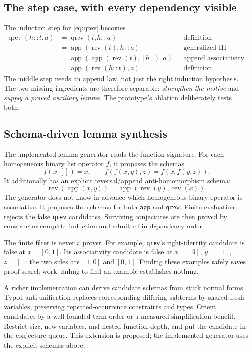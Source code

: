 \documentclass[11pt,letterpaper]{article}
\newcommand{\code}[1]{\texttt{#1}}
\theoremstyle{definition}\newtheorem{definition}[theorem]{Definition}
\theoremstyle{remark}\newtheorem{remark}[theorem]{Remark}
\begin{document}
\subsection{The step case, with every dependency visible}
The induction step for \eqref{eq:qrev} becomes
\begin{align*}
\operatorname{qrev}(h::t,a)
 &=\operatorname{qrev}(t,h::a) &&\text{definition}\\
 &=\operatorname{app}(\operatorname{rev}(t),h::a) &&\text{generalized IH}\\
 &=\operatorname{app}(\operatorname{app}(\operatorname{rev}(t),[h]),a)
       &&\text{append associativity and definitions}\\
 &=\operatorname{app}(\operatorname{rev}(h::t),a) &&\text{definition}.
\end{align*}
The middle step needs an append law, not just the right induction hypothesis. The two missing ingredients are therefore separable: \emph{strengthen the motive} and \emph{supply a proved auxiliary lemma}. The prototype's ablation deliberately tests both.

\subsection{Schema-driven lemma synthesis}
The implemented lemma generator reads the function signature. For each homogeneous binary list operator $f$, it proposes the schemas
\[
 f(x,[])=x,\qquad f(f(x,y),z)=f(x,f(y,z)).
\]
It additionally has an explicit reversal/append anti-homomorphism schema:
\[
 \operatorname{rev}(\operatorname{app}(x,y))
 =\operatorname{app}(\operatorname{rev}(y),\operatorname{rev}(x)).
\]
The generator does not know in advance which homogeneous binary operator is associative. It proposes the schemas for both \code{app} and \code{qrev}. Finite evaluation rejects the false \code{qrev} candidates. Surviving conjectures are then proved by constructor-complete induction and admitted in dependency order.

The finite filter is never a prover. For example, \code{qrev}'s right-identity candidate is false at $x=[0,1]$. Its associativity candidate is false at $x=[0]$, $y=[1]$, $z=[]$: the two sides are $[1,0]$ and $[0,1]$. Finding these examples safely saves proof-search work; failing to find an example establishes nothing.

A richer implementation can derive candidate schemas from stuck normal forms. Typed anti-unification replaces corresponding differing subterms by shared fresh variables, preserving repeated-occurrence constraints and types. Orient candidates by a well-founded term order or a measured simplification benefit. Restrict size, new variables, and nested function depth, and put the candidate in the conjecture queue. This extension is proposed; the implemented generator uses the explicit schemas above.
\end{document}
